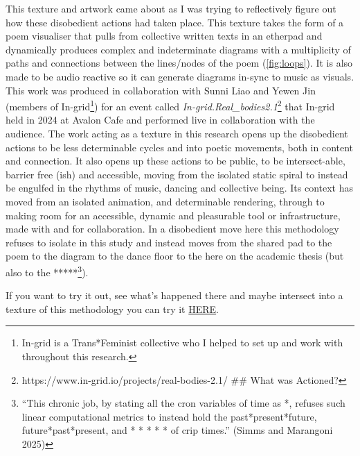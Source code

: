 This texture and artwork came about as I was trying to reflectively
figure out how these disobedient actions had taken place. This texture
takes the form of a poem visualiser that pulls from collective written
texts in an etherpad and dynamically produces complex and indeterminate
diagrams with a multiplicity of paths and connections between the
lines/nodes of the poem (\cref{fig:loops}). It is also made to be audio
reactive so it can generate diagrams in-sync to music as visuals. This
work was produced in collaboration with Sunni Liao and Yewen Jin
(members of In-grid\footnote{In-grid is a Trans*Feminist collective who
  I helped to set up and work with throughout this research.}) for an
event called \emph{In-grid.Real\_bodies2.1}\footnote{https://www.in-grid.io/projects/real-bodies-2.1/
  \#\# What was Actioned?} that In-grid held in 2024 at Avalon Cafe and
performed live in collaboration with the audience. The work acting as a
texture in this research opens up the disobedient actions to be less
determinable cycles and into poetic movements, both in content and
connection. It also opens up these actions to be public, to be
intersect-able, barrier free (ish) and accessible, moving from the
isolated static spiral to instead be engulfed in the rhythms of music,
dancing and collective being. Its context has moved from an isolated
animation, and determinable rendering, through to making room for an
accessible, dynamic and pleasurable tool or infrastructure, made with
and for collaboration. In a disobedient move here this methodology
refuses to isolate in this study and instead moves from the shared pad
to the poem to the diagram to the dance floor to the here on the
academic thesis (but also to the *****\footnote{``This chronic job, by
  stating all the cron variables of time as *, refuses such linear
  computational metrics to instead hold the past*present*future,
  future*past*present, and * * * * * of crip times.'' (Simms and
  Marangoni 2025)}).

If you want to try it out, see what's happened there and maybe intersect
into a texture of this methodology you can try it
\href{https://georgie-png.github.io/etherpad-vis/}{HERE}.

